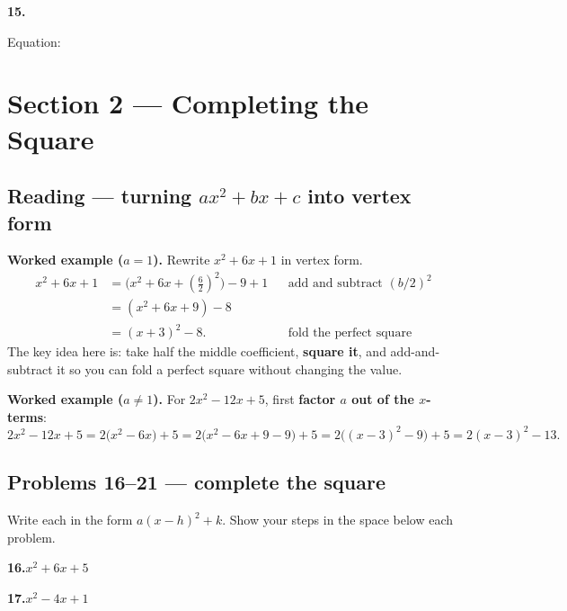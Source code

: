 \documentclass[12pt]{article}
\newcommand{\gridaxes}[1]{%
  \draw[step=1,gray!25,very thin] (-#1,-#1) grid (#1,#1);%
  \draw[thick,->] (-#1-0.4,0)--(#1+0.4,0) node[right]{\scriptsize$x$};%
  \draw[thick,->] (0,-#1-0.4)--(0,#1+0.4) node[above]{\scriptsize$y$};%
  \foreach \n in {-#1,...,#1}{\ifnum\n=0\else
      \draw (\n,0.07)--(\n,-0.07) node[below]{\tiny$\n$};
      \draw (0.07,\n)--(-0.07,\n) node[left]{\tiny$\n$};\fi}%
}
\begin{document}
\begin{minipage}[t]{0.48\linewidth}
\textbf{15.}\\[2pt]
\centering
{}
\par\vspace{9mm}\raggedright Equation: \underline{\hspace{4.5cm}}
\end{minipage}
\newpage
\section*{Section 2 --- Completing the Square}
\subsection*{Reading --- turning $ax^2+bx+c$ into vertex form}
\textbf{Worked example ($a=1$).} Rewrite $x^2 + 6x + 1$ in vertex form.
\begin{align*}
  x^2 + 6x + 1
  &= \big(x^2 + 6x + (\tfrac{6}{2})^2\big) - 9 + 1 && \text{add and subtract } (b/2)^2 \\
  &= (x^2 + 6x + 9) - 8 \\
  &= (x+3)^2 - 8. && \text{fold the perfect square}
\end{align*}
The key idea here is: take half the middle coefficient, \textbf{square it}, and add-and-subtract it so you can fold a
perfect square without changing the value.

\medskip
\textbf{Worked example ($a\neq 1$).} For $2x^2 - 12x + 5$, first \textbf{factor $a$ out of the $x$-terms}:
\[
  2x^2 - 12x + 5 = 2\big(x^2 - 6x\big) + 5 = 2\big(x^2 - 6x + 9 - 9\big) + 5 = 2\big((x-3)^2 - 9\big) + 5 = 2(x-3)^2 - 13 .
\]
\subsection*{Problems 16--21 --- complete the square}
Write each in the form $a(x-h)^2 + k$. Show your steps in the space below each problem.

\bigskip
\textbf{16.}\quad $x^2 + 6x + 5$

\vspace{3.2cm}
\textbf{17.}\quad $x^2 - 4x + 1$
\end{document}
